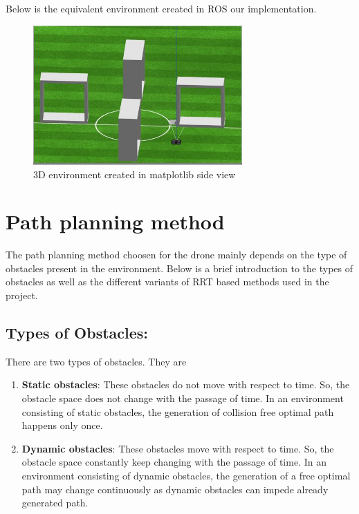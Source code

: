 \documentclass{IEEEtran}
\begin{document}
\newline
Below is the equivalent environment created in ROS our implementation.
\newpage
\begin{figure}[h]
    \centering
    \includegraphics[width=8cm]{gazebo}
    \caption{3D environment created in matplotlib side view}
    \label{fig:3D environment created in matplotlib}
\end{figure}

\section{\textbf{Path planning method}} 
The path planning method choosen for the drone mainly depends on the type of obstacles present in the environment.
Below is a brief introduction to the types of obstacles as well as the different variants of RRT based methods used in the project.

\subsection{\textbf{Types of Obstacles}:}There are two types of obstacles. They are
\begin{enumerate}
\item \textbf{Static obstacles}: These obstacles do not move with respect to time. So, the obstacle space does not change with the passage of time. In an environment consisting of static obstacles, the generation of collision free optimal path happens only once.
\item \textbf{Dynamic obstacles}: These obstacles move with respect to time. So, the obstacle space constantly keep changing with the passage of time.  In an environment consisting of dynamic obstacles, the generation of  a  free optimal path may change continuously as dynamic obstacles can impede already generated path.
\end{enumerate} 
\end{document}

